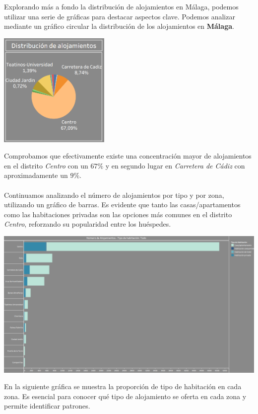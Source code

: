 Explorando más a fondo la distribución de alojamientos en Málaga, podemos utilizar una serie de gráficas para destacar aspectos clave.
Podemos analizar mediante un gráfico circular la distribución de los alojamientos en \textbf{Málaga}. 
\begin{center}
    \centering
    \includegraphics[width=0.4\textwidth]{capturas/6.png}
\end{center}
Comprobamos que efectivamente existe una concentración mayor de alojamientos en el distrito \textit{Centro} con un $67\%$ y en segundo lugar en \textit{Carretera de Cádiz} con aproximadamente un $9\%$.\\\\
Continuamos analizando el número de alojamientos por tipo y por zona, utilizando un gráfico de barras. Es evidente que tanto las casas/apartamentos como las habitaciones privadas son las opciones más comunes en el distrito \textit{Centro}, reforzando su popularidad entre los huéspedes.
\begin{center}
    \centering
    \includegraphics[width=1\textwidth]{capturas/7.png}
\end{center}
En la siguiente gráfica se muestra la proporción de tipo de habitación en cada zona. Es esencial para conocer qué tipo de alojamiento se oferta en cada zona y permite identificar patrones.
